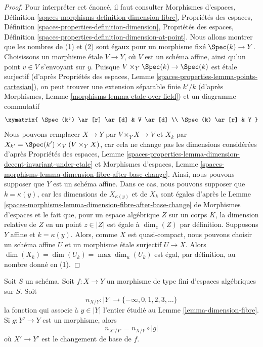 \begin{proof}
Pour interpréter cet énoncé, il faut consulter
Morphismes d'espaces, Définition
\ref{spaces-morphisms-definition-dimension-fibre},
Propriétés des espaces,
Définition \ref{spaces-properties-definition-dimension},
Propriétés des espaces,
Définition \ref{spaces-properties-definition-dimension-at-point}.
Nous allons montrer que les nombres de (1) et (2) sont égaux pour
un morphisme fixé $\Spec(k) \to Y$.
Choisissons un morphisme étale $V \to Y$, où $V$ est un schéma
affine, ainsi qu'un point $v \in V$ s'envoyant sur $y$.
Puisque $V \times_Y \Spec(k) \to \Spec(k)$ est étale surjectif
(d'après Propriétés des espaces, Lemme \ref{spaces-properties-lemma-points-cartesian}),
on peut trouver une extension séparable finie $k'/k$
(d'après Morphismes, Lemme \ref{morphisms-lemma-etale-over-field})
et un diagramme commutatif
$$
\xymatrix{
\Spec(k') \ar[r] \ar[d] & V \ar[d] \\
\Spec(k) \ar[r] & Y
}
$$
Nous pouvons remplacer $X \to Y$ par $V \times_Y X \to V$ et
$X_k$ par $X_{k'} = \Spec(k') \times_V (V \times_Y X)$,
car cela ne change pas les dimensions considérées d'après
Propriétés des espaces, Lemme
\ref{spaces-properties-lemma-dimension-decent-invariant-under-etale}
et Morphismes d'espaces, Lemme
\ref{spaces-morphisms-lemma-dimension-fibre-after-base-change}.
Ainsi, nous pouvons supposer que $Y$ est un schéma affine.
Dans ce cas, nous pouvons supposer que $k = \kappa(y)$,
car les dimensions de $X_{\kappa(y)}$ et de $X_k$
sont égales d'après le Lemme
\ref{spaces-morphisms-lemma-dimension-fibre-after-base-change} de Morphismes d'espaces
et le fait que, pour un espace algébrique $Z$ sur un corps $K$, la
dimension relative de $Z$ en un point $z \in |Z|$
est égale à $\dim_z(Z)$ par définition.
Supposons $Y$ affine et $k = \kappa(y)$. Alors,
comme $X$ est quasi-compact, nous pouvons choisir un schéma affine $U$ et
un morphisme étale surjectif $U \to X$.
Alors $\dim(X_k) = \dim(U_k) = \max \dim_u(U_k)$
est égal, par définition, au nombre donné en (1).
\end{proof}

\begin{lemma}
\label{lemma-base-change-dimension-fibres}
Soit $S$ un schéma. Soit $f : X \to Y$ un morphisme de type fini
d'espaces algébriques sur $S$. Soit
$$
n_{X/Y} : |Y| \to \{-\infty, 0, 1, 2, 3, \ldots\}
$$
la fonction qui associe à $y \in |Y|$
l'entier étudié au Lemme \ref{lemma-dimension-fibre}.
Si $g : Y' \to Y$ est un morphisme, alors
$$
n_{X'/Y'} = n_{X/Y} \circ |g|
$$
où $X' \to Y'$ est le changement de base de $f$.
\end{lemma}

